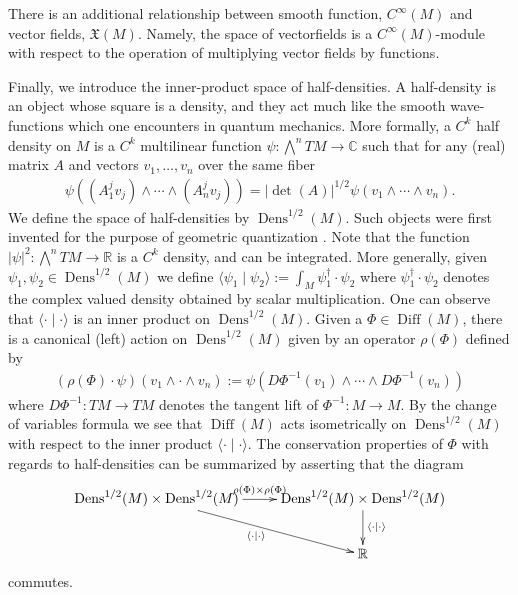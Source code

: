 \documentclass[12pt]{amsart}
\newcommand{\R}{\ensuremath{\mathbb{R}}}
\DeclareMathOperator{\Diff}{Diff}
\DeclareMathOperator{\Dens}{Dens}
\begin{document}
There is an additional relationship between smooth function, $C^\infty(M)$ and vector fields, $\mathfrak{X}(M)$.
Namely, the space of vectorfields is a $C^\infty(M)$-module
with respect to the operation of multiplying vector fields by functions.

Finally, we introduce the inner-product space of half-densities.
A half-density is an object whose square is a density, and they act much like
the smooth wave-functions which one encounters in quantum mechanics.
More formally, a $C^k$ half density on $M$ is a $C^k$ multilinear function $\psi : \bigwedge^n TM \to \mathbb{C}$
such that for any (real) matrix $A$ and vectors $v_1,\dots,v_n$ over the same fiber
\begin{align*}
	\psi( (A_1^j v_j) \wedge \cdots \wedge (A_n^j v_j) ) =  | \det(A) |^{1/2} \psi(v_1 \wedge \cdots \wedge v_n).
\end{align*}
We define the space of half-densities by $\Dens^{1/2}(M)$.
Such objects were first invented for the purpose of geometric quantization \cite[see Chapter 4]{GuilleminSternberg1970}.
Note that the function $|\psi|^2 : \bigwedge^n TM \to \R$ is a $C^k$ density, and can be integrated.
More generally, given $\psi_1,\psi_2 \in \Dens^{1/2}(M)$ we define $\langle \psi_1 \mid \psi_2 \rangle := \int_M \psi_1^\dagger \cdot \psi_2$
where $\psi_1^\dagger \cdot \psi_2 $ denotes the complex valued density obtained by scalar multiplication.
One can observe that $\langle \cdot \mid \cdot \rangle$ is an inner product on $\Dens^{1/2}(M)$.
Given a $\Phi \in \Diff(M)$, there is a canonical (left) action on $\Dens^{1/2}(M)$ given by an operator $\rho(\Phi)$ defined by
\begin{align*}
	(\rho(\Phi) \cdot \psi)( v_1 \wedge \cdot \wedge v_n) := \psi( D\Phi^{-1}(v_1) \wedge \cdots \wedge D\Phi^{-1}(v_n) )
\end{align*}
where $D\Phi^{-1} : TM \to TM$ denotes the tangent lift of $\Phi^{-1}:M \to M$.
By the change of variables formula we see that $\Diff(M)$ acts isometrically on $\Dens^{1/2}(M)$ with respect to 
the inner product $\langle \cdot \mid \cdot \rangle$.
The conservation properties of $\Phi$ with regards to half-densities can be summarized by asserting that the diagram
\begin{equation*}
	\xymatrix{
		\Dens^{1/2}(M) \times \Dens^{1/2}(M) \ar[dr]_{\langle \cdot \mid \cdot \rangle} \ar[r]^{\rho(\Phi) \times \rho(\Phi)} & \Dens^{1/2}(M) \times \Dens^{1/2}(M) \ar[d]^{\langle \cdot \mid \cdot \rangle} \\
		&\mathbb{R}
	}
\end{equation*}
commutes.
\end{document}
